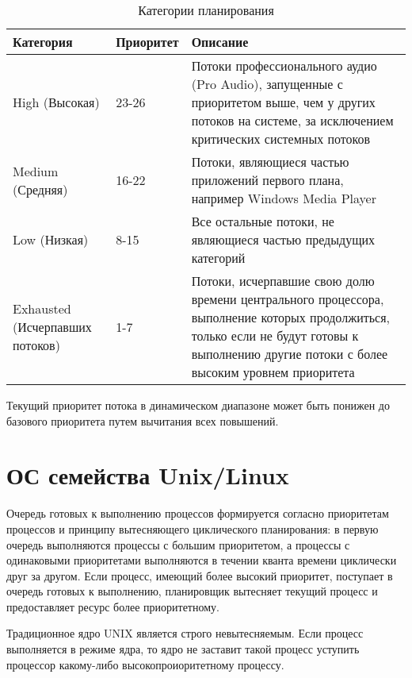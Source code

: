 \begin{table}[h]
    \caption{Категории планирования}
    \begin{center}
        \begin{tabular}{|p{40mm}|p{30mm}|p{80mm}|}
            \hline
            \textbf{Категория} & \textbf{Приоритет} & \textbf{Описание} \\
            \hline
            High (Высокая) & 23-26 & Потоки профессионального аудио (Pro
Audio), запущенные с приоритетом выше, чем у других потоков на системе, за
исключением критических системных потоков \\
            \hline
            Medium (Средняя) & 16-22 & Потоки, являющиеся частью приложений
первого плана, например Windows Media Player \\
            \hline
            Low (Низкая) & 8-15 & Все остальные потоки, не являющиеся частью
предыдущих категорий \\
            \hline
            Exhausted (Исчерпавших потоков) & 1-7 & Потоки, исчерпавшие свою
долю времени центрального процессора, выполнение которых продолжиться, только
если не будут готовы к выполнению другие потоки с более высоким уровнем
приоритета \\
            \hline
        \end{tabular}
    \end{center}
    \label{tab:plan}
\end{table}

Текущий приоритет потока в динамическом диапазоне может быть понижен до
базового приоритета путем вычитания всех повышений.

\section{ОС семейства Unix/Linux}

Очередь готовых к выполнению процессов формируется согласно приоритетам
процессов и принципу вытесняющего циклического планирования: в первую очередь
выполняются процессы с большим приоритетом, а процессы с одинаковыми
приоритетами выполняются в течении кванта времени циклически друг за другом.
Если процесс, имеющий более высокий приоритет, поступает в очередь готовых к
выполнению, планировщик вытесняет текущий процесс и предоставляет ресурс более
приоритетному.

Традиционное ядро UNIX является строго невытесняемым. Если процесс выполняется
в режиме ядра, то ядро не заставит такой процесс уступить процессор
какому-либо высокопроиоритетному процессу.

